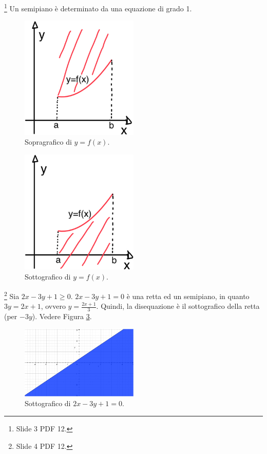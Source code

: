 \begin{definition}[Semipiano]\footnote{Slide 3 PDF 12.}
    Un semipiano è determinato da una equazione di grado 1.
\end{definition}

\begin{figure}
    \centering
    \includegraphics[width=0.5\textwidth]{Analisi2/figures/sopragrafico_f_R2.jpg}
        \caption{Sopragrafico di $y=f(x)$.}\label{fig:sopragrafico_f_R2}
\end{figure}

\begin{figure}
    \centering
    \includegraphics[width=0.5\textwidth]{Analisi2/figures/sottografico_f_R2.jpg}
        \caption{Sottografico di $y=f(x)$.}\label{fig:sottografico_f_R2}
\end{figure}

\begin{example}\footnote{Slide 4 PDF 12.}
    Sia $2x-3y+1\geq 0$. $2x-3y+1=0$ è una retta ed un semipiano, in quanto $3y=2x+1$, ovvero $y=\frac{2x+1}{3}$. Quindi, la disequazione è il sottografico della retta (per $-3y$). Vedere Figura \ref{fig:esempio_sottografico}.
    \begin{figure}
    \centering
    \includegraphics[width=0.5\textwidth]{Analisi2/figures/esempio_sottografico.jpg}
        \caption{Sottografico di $2x-3y+1=0$.}\label{fig:esempio_sottografico}
    \end{figure}
\end{example}

